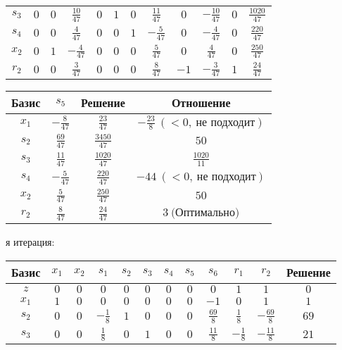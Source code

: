 \documentclass{article}%
\begin{document}
\begin{flushleft}
\begin{tabular}{|c|cccccccccc|c|}
$s_{3}$&$0$&$0$&$\frac{10}{47}$&$0$&$1$&$0$&$\frac{11}{47}$&$0$&$-\frac{10}{47}$&$0$&$\frac{1020}{47}$\\%
$s_{4}$&$0$&$0$&$\frac{4}{47}$&$0$&$0$&$1$&$-\frac{5}{47}$&$0$&$-\frac{4}{47}$&$0$&$\frac{220}{47}$\\%
$x_{2}$&$0$&$1$&$-\frac{4}{47}$&$0$&$0$&$0$&$\frac{5}{47}$&$0$&$\frac{4}{47}$&$0$&$\frac{250}{47}$\\%
$r_{2}$&$0$&$0$&$\frac{3}{47}$&$0$&$0$&$0$&$\frac{8}{47}$&$-1$&$-\frac{3}{47}$&$1$&$\frac{24}{47}$\\%
\hline%
\end{tabular}%
\newline%
\newline%
\newline%
\begin{tabular}{|cccc|}%
\hline%
Базис&$s_{5}$&Решение&Отношение\\%
\hline%
$x_{1}$&$-\frac{8}{47}$&$\frac{23}{47}$&$-\frac{23}{8}\: (< 0, \: \text{не подходит})$\\%
$s_{2}$&$\frac{69}{47}$&$\frac{3450}{47}$&$50$\\%
$s_{3}$&$\frac{11}{47}$&$\frac{1020}{47}$&$\frac{1020}{11}$\\%
$s_{4}$&$-\frac{5}{47}$&$\frac{220}{47}$&$-44\: (< 0, \: \text{не подходит})$\\%
$x_{2}$&$\frac{5}{47}$&$\frac{250}{47}$&$50$\\%
$r_{2}$&$\frac{8}{47}$&$\frac{24}{47}$&$3\: \text{(Оптимально)}$\\%
\hline%
\end{tabular}%
\newline%
\newline%
я итерация: %
\newline%
\newline%
\renewcommand{\arraystretch}{1.3}%
\begin{tabular}{|c|cccccccccc|c|}%
\hline%
Базис&$x_{1}$&$x_{2}$&$s_{1}$&$s_{2}$&$s_{3}$&$s_{4}$&$s_{5}$&$s_{6}$&$r_{1}$&$r_{2}$&Решение\\%
\hline%
$z$&$0$&$0$&$0$&$0$&$0$&$0$&$0$&$0$&$1$&$1$&$0$\\%
\hline%
$x_{1}$&$1$&$0$&$0$&$0$&$0$&$0$&$0$&$-1$&$0$&$1$&$1$\\%
$s_{2}$&$0$&$0$&$-\frac{1}{8}$&$1$&$0$&$0$&$0$&$\frac{69}{8}$&$\frac{1}{8}$&$-\frac{69}{8}$&$69$\\%
$s_{3}$&$0$&$0$&$\frac{1}{8}$&$0$&$1$&$0$&$0$&$\frac{11}{8}$&$-\frac{1}{8}$&$-\frac{11}{8}$&$21$\\%

\end{tabular}
\end{flushleft}
\end{document}
